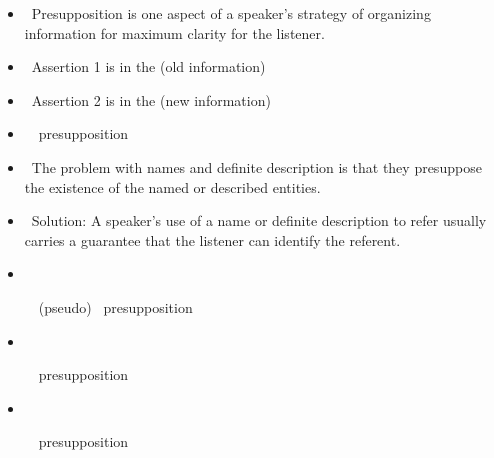 \documentclass[a4paper,landscape,headrule,footrule,xetex]{foils}
\begin{document}
\begin{itemize}
\item  Presupposition is one aspect of a speaker's strategy of
organizing information for maximum clarity for the listener.
\item  Assertion 1 is in the  (old information)
\item  Assertion 2 is in the  (new information)
\end{itemize}
   
\begin{itemize}
\item 
  \begin{exe}
  \ex  
  \ex   \hfill presupposition
\end{exe}
\item  The problem with names and definite description is that they
presuppose the existence of the named or described entities.
\item  Solution: A speaker's use of a name or
definite description to refer usually carries a guarantee that the
listener can identify the referent.
\end{itemize}

\begin{itemize}
\item  
\begin{exe}
\ex  
\ex   (pseudo)
\ex   \hfill presupposition
\end{exe}
\item  
\begin{exe}
\ex  
\ex   \hfill presupposition
\end{exe}
\item  
\begin{exe}
\ex  
\ex   \hfill presupposition
\end{exe}
\end{itemize}
\end{document}

